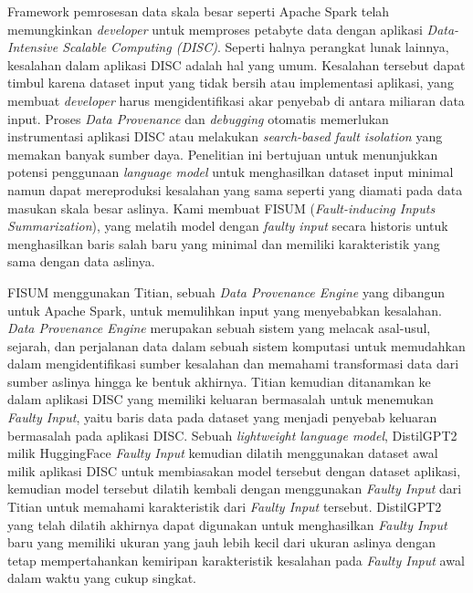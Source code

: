 
Framework pemrosesan data skala besar seperti Apache Spark telah memungkinkan \textit{developer} untuk memproses petabyte data dengan aplikasi \textit{Data-Intensive Scalable Computing (DISC)}. Seperti halnya perangkat lunak lainnya, kesalahan dalam aplikasi DISC adalah hal yang umum. Kesalahan tersebut dapat timbul karena dataset input yang tidak bersih atau implementasi aplikasi, yang membuat \textit{developer} harus mengidentifikasi akar penyebab di antara miliaran data input. Proses \textit{Data Provenance} dan \textit{debugging} otomatis memerlukan instrumentasi aplikasi DISC atau melakukan \textit{search-based fault isolation} yang memakan banyak sumber daya. Penelitian ini bertujuan untuk menunjukkan potensi penggunaan \textit{language model} untuk menghasilkan dataset input minimal namun dapat mereproduksi kesalahan yang sama seperti yang diamati pada data masukan skala besar aslinya. Kami membuat FISUM (\textit{Fault-inducing Inputs Summarization}), yang melatih model dengan \textit{faulty input} secara historis untuk menghasilkan baris salah baru yang minimal dan memiliki karakteristik yang sama dengan data aslinya.

FISUM menggunakan Titian, sebuah \textit{Data Provenance Engine} yang dibangun untuk Apache Spark, untuk memulihkan input yang menyebabkan kesalahan. \textit{Data Provenance Engine} merupakan sebuah sistem yang melacak asal-usul, sejarah, dan perjalanan data dalam sebuah sistem komputasi untuk memudahkan dalam mengidentifikasi sumber kesalahan dan memahami transformasi data dari sumber aslinya hingga ke bentuk akhirnya. Titian kemudian ditanamkan ke dalam aplikasi DISC yang memiliki keluaran bermasalah untuk menemukan \textit{Faulty Input}, yaitu baris data pada dataset yang menjadi penyebab keluaran bermasalah pada aplikasi DISC. Sebuah \textit{lightweight language model}, DistilGPT2 milik HuggingFace \textit{Faulty Input} kemudian dilatih menggunakan dataset awal milik aplikasi DISC untuk membiasakan model tersebut dengan dataset aplikasi, kemudian model tersebut dilatih kembali dengan menggunakan \textit{Faulty Input} dari Titian untuk memahami karakteristik dari \textit{Faulty Input} tersebut. DistilGPT2 yang telah dilatih akhirnya dapat digunakan untuk menghasilkan \textit{Faulty Input} baru yang memiliki ukuran yang jauh lebih kecil dari ukuran aslinya dengan tetap mempertahankan kemiripan karakteristik kesalahan pada \textit{Faulty Input} awal dalam waktu yang cukup singkat.

